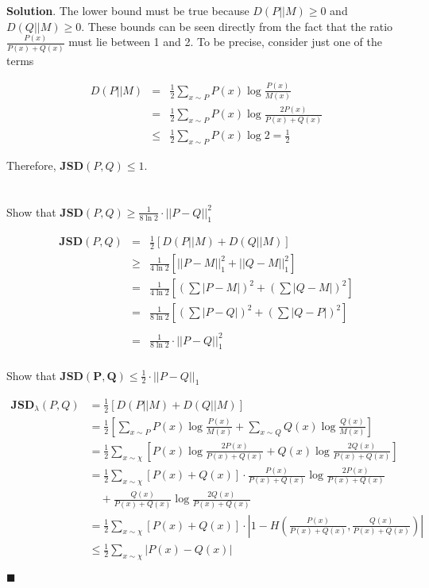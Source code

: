 \documentclass[12pt]{article}
\theoremstyle{definition}
\newenvironment{s}{%
        \begin{trivlist} \item \textbf{Solution}. }{%
            \hspace*{\fill} $\blacksquare$\end{trivlist}}%
\begin{document}
{\begin{s}
The lower bound must be true because $D(P||M) \geq 0$ and $D(Q||M) \geq 0$. These bounds can be seen directly from the fact that the ratio $\frac{P(x)}{P(x)+Q(x)}$ must lie between 1 and 2. To be precise, consider just one of the terms

\begin{eqnarray*}
D(P||M) &=& \frac{1}{2}\sum_{x\sim P} P(x)\log \frac{P(x)}{M(x)}\\
&=&  \frac{1}{2}\sum_{x\sim P} P(x)\log \frac{2P(x)}{P(x)+Q(x)}\\
&\leq &  \frac{1}{2}\sum_{x\sim P} P(x)\log 2 = \frac{1}{2}
\end{eqnarray*}

Therefore, $\mathbf{JSD}(P,Q) \leq 1$.
\\
\\
\\
Show that $\mathbf{JSD}(P,Q) \geq \frac{1}{8\ln 2} \cdot ||P-Q||_{1}^{2}$

\begin{eqnarray*}
\mathbf{JSD}(P,Q) &=&  \frac{1}{2}\left[D(P||M) + D(Q||M)\right]\\
&\geq & \frac{1}{4\ln 2}\left[||P-M||_{1}^{2} + ||Q-M||_{1}^{2}\right]\\
&= & \frac{1}{4\ln 2}\left[\left(\sum |P-M|\right)^{2} + \left(\sum |Q-M|\right)^{2} \right]\\ &= & \frac{1}{8\ln 2}\left[\left(\sum |P-Q|\right)^{2} + \left(\sum |Q-P|\right)^{2} \right]\\
\\ &= & \frac{1}{8\ln 2} \cdot ||P-Q||_{1}^{2}\\
\end{eqnarray*}

Show that $\mathbf{JSD(P,Q)} \leq \frac{1}{2}\cdot ||P-Q||_{1}$ 

\begin{align*}
\mathbf{JSD}_{\lambda}(P,Q) &=  \frac{1}{2}\left[D(P||M) + D(Q||M)\right]\\
&= \frac{1}{2}\left[\sum_{x\sim P} P(x)\log\frac{P(x)}{M(x)} + \sum_{x\sim Q} Q(x)\log\frac{Q(x)}{M(x)}\right]\\
&= \frac{1}{2}\sum_{x\sim \chi}\left[P(x)\log\frac{2P(x)}{P(x)+Q(x)} + Q(x)\log\frac{2Q(x)}{P(x)+Q(x)} \right]\\
&= \frac{1}{2}\sum_{x\sim \chi}\left[P(x)+Q(x)\right]\cdot\frac{P(x)}{P(x)+Q(x)}\log\frac{2P(x)}{P(x)+Q(x)}\\
&\quad + \frac{Q(x)}{P(x)+Q(x)}\log\frac{2Q(x)}{P(x)+Q(x)}\\
&= \frac{1}{2}\sum_{x\sim \chi}\left[P(x)+Q(x)\right] \cdot |1-H\left(\frac{P(x)}{P(x)+Q(x)},\frac{Q(x)}{P(x)+Q(x)}\right)|\\
&\leq \frac{1}{2}\sum_{x\sim \chi} |P(x)-Q(x)|
\end{align*}


\end{s}}
\end{document}
